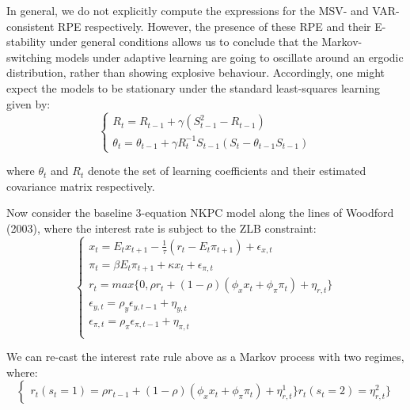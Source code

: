 \documentclass[12pt,reqno]{article}
\numberwithin{equation}{section}
\begin{document}
In general, we do not explicitly compute the expressions for the MSV- and VAR-consistent RPE respectively. However, the presence of these RPE and their E-stability under general conditions allows us to conclude that the Markov-switching models under adaptive learning are going to oscillate around an ergodic distribution, rather than showing explosive behaviour. Accordingly, one might expect the models to be stationary under the standard least-squares learning given by: \\


$$
\begin{cases}

R_t = R_{t-1} + \gamma (S_{t-1}^2 - R_{t-1} ) \\
\theta_t = \theta_{t-1} + \gamma R_t^{-1} S_{t-1} (S_t - \theta_{t-1} S_{t-1}) 
\end{cases}
$$

where $\theta_t$ and $R_t$    denote the set of learning coefficients and their estimated covariance matrix respectively.  

Now consider the baseline 3-equation NKPC model along the lines of Woodford (2003), where the interest rate is subject to the ZLB constraint: \\

$$
\begin{cases} 
x_t = E_t x_{t+1}  -\frac{1}{\tau}(r_t - E_t \pi_{t+1})+ \epsilon_{x,t} \\
\pi_t = \beta E_t \pi_{t+1} + \kappa x_t + \epsilon_{\pi,t} \\
r_t = max\{ 0, \rho r_t+(1-\rho) (\phi_x x_t + \phi_{\pi} \pi_t )+ \eta_{r,t}\} \\
\epsilon_{y,t} = \rho_y \epsilon_{y,t-1} + \eta_{y,t} \\ 
\epsilon_{\pi,t} = \rho_{\pi} \epsilon_{\pi,t-1} + \eta_{\pi,t} \\
\end{cases} 
$$

We can re-cast the interest rate rule above as a Markov process with two regimes, where: \\

$$
\begin{cases}
r_t (s_t=1) = \rho r_{t-1} +(1-\rho) (\phi_x x_t + \phi_{\pi} \pi_t) + \eta^{1}_{r,t}\} 
r_t (s_t=2) =\eta^{2}_{r,t}\} 
\end{cases}
$$
\end{document}
